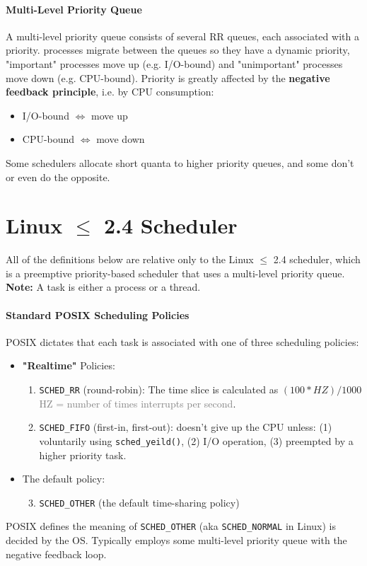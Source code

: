 \documentclass[openany,12pt]{book}
\newcommand{\code}[1]{\texttt{#1}}
\newcommand{\gray}[1]{\textcolor{gray}{#1}}
\begin{document}
\paragraph{Multi-Level Priority Queue} A multi-level priority queue consists of several RR queues, each associated with a priority. processes migrate between the queues so they have a dynamic priority, "important" processes move up (e.g. I/O-bound) and "unimportant" processes move down (e.g. CPU-bound). Priority is greatly affected by the \textbf{negative feedback principle}, i.e. by CPU consumption:
\begin{itemize}
  \item I/O-bound \(\Longleftrightarrow\) move up
  \item CPU-bound \(\Longleftrightarrow\) move down
\end{itemize}
Some schedulers allocate short quanta to higher priority queues, and some don't or even do the opposite.



\section*{Linux \(\leq\) 2.4 Scheduler}
All of the definitions below are relative only to the Linux \(\leq\) 2.4 scheduler, which is a preemptive priority-based scheduler that uses a multi-level priority queue. \textbf{Note:} A task is either a process or a thread.

\paragraph{Standard POSIX Scheduling Policies} POSIX dictates that each task is associated with one of three scheduling policies:
\begin{itemize}
  \item \textbf{"Realtime"} Policies:
        \begin{enumerate}
          \item \code{SCHED\_RR} (round-robin): The time slice is calculated as \((100 * HZ)/ 1000\) \gray{HZ = number of times interrupts per second}.
          \item \code{SCHED\_FIFO} (first-in, first-out): doesn't give up the CPU unless: (1) voluntarily using \code{sched\_yeild()}, (2) I/O operation, (3) preempted by a higher priority task.
        \end{enumerate}
  \item The default policy:
        \begin{enumerate}
          \setcounter{enumi}{2}
          \item \code{SCHED\_OTHER} (the default time-sharing policy)
        \end{enumerate}
\end{itemize}
POSIX defines the meaning of \code{SCHED\_OTHER} (aka \code{SCHED\_NORMAL} in Linux) is decided by the OS. Typically employs some multi-level priority queue with the negative feedback loop.
\end{document}
